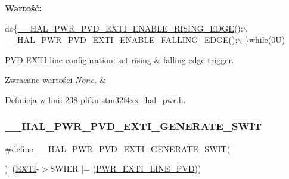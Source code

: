 {\bfseries Wartość\+:}
\begin{DoxyCode}
\textcolor{keywordflow}{do}\{\hyperlink{group___p_w_r___exported___macro_ga7bef3f30c9fe267c99d5240fbf3f878c}{\_\_HAL\_PWR\_PVD\_EXTI\_ENABLE\_RISING\_EDGE}();\(\backslash\)
                                                             \_\_HAL\_PWR\_PVD\_EXTI\_ENABLE\_FALLING\_EDGE();\(\backslash\)
                                                            \}\textcolor{keywordflow}{while}(0U)
\end{DoxyCode}


P\+VD E\+X\+TI line configuration\+: set rising \& falling edge trigger. 


\begin{DoxyRetVals}{Zwracane wartości}
{\em None.} & \\
\hline
\end{DoxyRetVals}


Definicja w linii 238 pliku stm32f4xx\+\_\+hal\+\_\+pwr.\+h.

\mbox{\label{group___p_w_r___exported___macro_gaba4a7968f5c4c4ca6a7047b147ba18d4}} 
\subsubsection{\texorpdfstring{\+\_\+\+\_\+\+H\+A\+L\+\_\+\+P\+W\+R\+\_\+\+P\+V\+D\+\_\+\+E\+X\+T\+I\+\_\+\+G\+E\+N\+E\+R\+A\+T\+E\+\_\+\+S\+W\+IT}{\_\_HAL\_PWR\_PVD\_EXTI\_GENERATE\_SWIT}}
{\footnotesize\ttfamily \#define \+\_\+\+\_\+\+H\+A\+L\+\_\+\+P\+W\+R\+\_\+\+P\+V\+D\+\_\+\+E\+X\+T\+I\+\_\+\+G\+E\+N\+E\+R\+A\+T\+E\+\_\+\+S\+W\+IT(\begin{DoxyParamCaption}{ }\end{DoxyParamCaption})~(\hyperlink{group___peripheral__declaration_ga9189e770cd9b63dadd36683eb9843cac}{E\+X\+TI}-\/$>$S\+W\+I\+ER $\vert$= (\hyperlink{group___p_w_r___p_v_d___e_x_t_i___line_ga43a49255649e03d2d2b6b12c5c379d2b}{P\+W\+R\+\_\+\+E\+X\+T\+I\+\_\+\+L\+I\+N\+E\+\_\+\+P\+VD}))}



